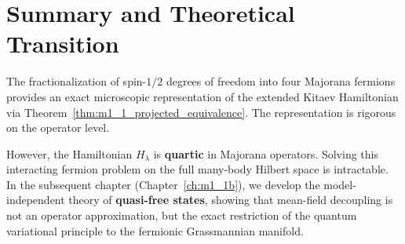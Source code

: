 \section{Summary and Theoretical Transition}
\label{sec:m1_1_summary}
The fractionalization of spin-$1/2$ degrees of freedom into four Majorana fermions provides an exact microscopic representation of the extended Kitaev Hamiltonian via Theorem~\ref{thm:m1_1_projected_equivalence}. The representation is rigorous on the operator level.

However, the Hamiltonian $H_\lambda$ is \textbf{quartic} in Majorana operators. Solving this interacting fermion problem on the full many-body Hilbert space is intractable. In the subsequent chapter (Chapter~\ref{ch:m1_1b}), we develop the model-independent theory of \textbf{quasi-free states}, showing that mean-field decoupling is not an operator approximation, but the exact restriction of the quantum variational principle to the fermionic Grassmannian manifold.
